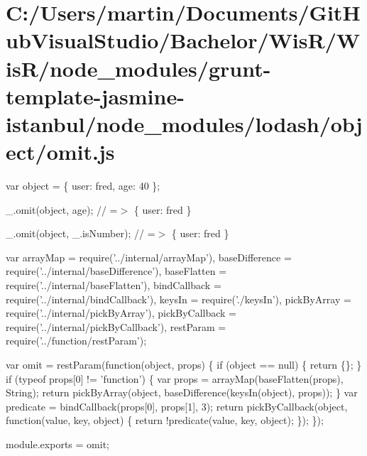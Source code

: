 \hypertarget{_c_1_2_users_2martin_2_documents_2_git_hub_visual_studio_2_bachelor_2_wis_r_2_wis_r_2node_module06f9103e837749748bfc9871670d3715}{}\section{C\+:/\+Users/martin/\+Documents/\+Git\+Hub\+Visual\+Studio/\+Bachelor/\+Wis\+R/\+Wis\+R/node\+\_\+modules/grunt-\/template-\/jasmine-\/istanbul/node\+\_\+modules/lodash/object/omit.\+js}
var object = \{ \textquotesingle{}user\textquotesingle{}\+: \textquotesingle{}fred\textquotesingle{}, \textquotesingle{}age\textquotesingle{}\+: 40 \};

\+\_\+.\+omit(object, \textquotesingle{}age\textquotesingle{}); // =$>$ \{ \textquotesingle{}user\textquotesingle{}\+: \textquotesingle{}fred\textquotesingle{} \}

\+\_\+.\+omit(object, \+\_\+.\+is\+Number); // =$>$ \{ \textquotesingle{}user\textquotesingle{}\+: \textquotesingle{}fred\textquotesingle{} \}


\begin{DoxyCodeInclude}
var arrayMap = require(\textcolor{stringliteral}{'../internal/arrayMap'}),
    baseDifference = require(\textcolor{stringliteral}{'../internal/baseDifference'}),
    baseFlatten = require(\textcolor{stringliteral}{'../internal/baseFlatten'}),
    bindCallback = require(\textcolor{stringliteral}{'../internal/bindCallback'}),
    keysIn = require(\textcolor{stringliteral}{'./keysIn'}),
    pickByArray = require(\textcolor{stringliteral}{'../internal/pickByArray'}),
    pickByCallback = require(\textcolor{stringliteral}{'../internal/pickByCallback'}),
    restParam = require(\textcolor{stringliteral}{'../function/restParam'});

var omit = restParam(\textcolor{keyword}{function}(\textcolor{keywordtype}{object}, props) \{
  \textcolor{keywordflow}{if} (\textcolor{keywordtype}{object} == null) \{
    \textcolor{keywordflow}{return} \{\};
  \}
  \textcolor{keywordflow}{if} (typeof props[0] != \textcolor{stringliteral}{'function'}) \{
    var props = arrayMap(baseFlatten(props), String);
    \textcolor{keywordflow}{return} pickByArray(\textcolor{keywordtype}{object}, baseDifference(keysIn(\textcolor{keywordtype}{object}), props));
  \}
  var predicate = bindCallback(props[0], props[1], 3);
  \textcolor{keywordflow}{return} pickByCallback(\textcolor{keywordtype}{object}, \textcolor{keyword}{function}(value, key, \textcolor{keywordtype}{object}) \{
    \textcolor{keywordflow}{return} !predicate(value, key, \textcolor{keywordtype}{object});
  \});
\});

module.exports = omit;
\end{DoxyCodeInclude}
 